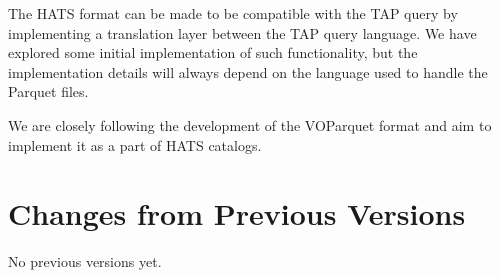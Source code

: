 \documentclass[11pt,a4paper]{ivoa}
\begin{document}
The HATS format can be made to be compatible with the TAP query \citep{IVOA:TAP} by implementing a translation layer between the TAP query language. 
We have explored some initial implementation of such functionality, but the implementation details will always depend on the language used to handle the Parquet files. \par

We are closely following the development of the VOParquet \citep{IVOAPARQUET} format and aim to implement it as a part of HATS catalogs.

\appendix
\section{Changes from Previous Versions}
No previous versions yet.

% 
\end{document}
